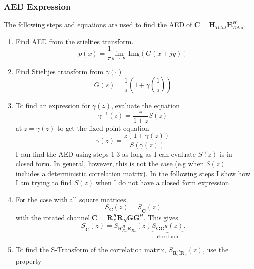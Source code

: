 \documentclass[12pt,a4paper]{report}
\begin{document}
\subsubsection{AED Expression}
	
	The following steps and equations are used to find the AED of $\mathbf{C} = \mathbf{H}_{Total} \mathbf{H}_{Total}^H$.
	\begin{enumerate}
	\item 
		Find AED from the stieltjes transform.
		\begin{equation}
		p(x) = \frac{1}{\pi} \underset{y \rightarrow \infty}{\text{lim}} \; \text{Img}(G(x+jy))
		\end{equation}
	\item 
		Find Stieltjes transform from $\gamma\left(\cdot \right)$
		\begin{equation}
		G(s)=  \frac{1}{s} (1+\gamma\left(\frac{1}{s}\right))
		\end{equation}
	\item 
		To find an expression for $\gamma(z)$, evaluate the equation
		\begin{equation}
		\gamma^{-1}(z) =  \frac{z}{1+z} S(z)
		\end{equation}
		at $z= \gamma(z)$
		to get the fixed point equation
		\begin{equation}
		\gamma(z) = \frac{z(1+ \gamma(z))}{S(\gamma(z))}
		\end{equation}
		I can find the AED using steps 1-3 as long as I can evaluate $S(z)$ is in closed form. 
		In general, however, this is not the case (e.g when $S(z)$ includes a deterministic correlation matrix). 
		In the following steps I show how I am trying to find $S(z)$ when I do not have a closed form expression. 
	\item 
		For the case with all square matrices, 
		\begin{equation}\label{rotation_property}
		S_{\mathbf{C}}(z) =  S_{\tilde{\mathbf{C}}}\left(z\right)
		\end{equation}
		with the rotated channel $\tilde{\mathbf{C}} = \mathbf{R}_{R}^H\mathbf{R}_{R}\mathbf{G}\mathbf{G}^H$.
		This gives
		\begin{equation}
		S_{\tilde{\mathbf{C}}}\left( z \right) = S_ {\mathbf{R}_{Rx}^H\mathbf{R}_{Rx}}(z)
		\underbrace{S_ {\mathbf{G}\mathbf{G}^H}(z)}_{\text{close form}}.
		\end{equation}
	\item 
		To find the S-Transform of the correlation matrix, $S_ {\mathbf{R}_{R}^H\mathbf{R}_{R}}(z)$,
		use the property 

\end{enumerate}
\end{document}
